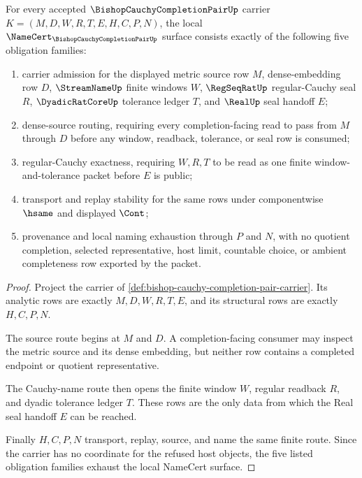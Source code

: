 \begin{theorem}
\label{thm:bishop-cauchy-completion-pair-namecert-obligations}
For every accepted $\BishopCauchyCompletionPairUp$ carrier $K=(M,D,W,R,T,E,H,C,P,N)$, the local $\NameCert_{\BishopCauchyCompletionPairUp}$ surface consists exactly of the following five obligation families:
\begin{enumerate}
\item carrier admission for the displayed metric source row $M$, dense-embedding row $D$, $\StreamNameUp$ finite windows $W$, $\RegSeqRatUp$ regular-Cauchy seal $R$, $\DyadicRatCoreUp$ tolerance ledger $T$, and $\RealUp$ seal handoff $E$;
\item dense-source routing, requiring every completion-facing read to pass from $M$ through $D$ before any window, readback, tolerance, or seal row is consumed;
\item regular-Cauchy exactness, requiring $W,R,T$ to be read as one finite window-and-tolerance packet before $E$ is public;
\item transport and replay stability for the same rows under componentwise $\hsame$ and displayed $\Cont$;
\item provenance and local naming exhaustion through $P$ and $N$, with no quotient completion, selected representative, host limit, countable choice, or ambient completeness row exported by the packet.
\end{enumerate}
\end{theorem}
\begin{proof}
Project the carrier of \autoref{def:bishop-cauchy-completion-pair-carrier}. Its analytic rows are exactly $M,D,W,R,T,E$, and its structural rows are exactly $H,C,P,N$.

The source route begins at $M$ and $D$. A completion-facing consumer may inspect the metric source and its dense embedding, but neither row contains a completed endpoint or quotient representative.

The Cauchy-name route then opens the finite window $W$, regular readback $R$, and dyadic tolerance ledger $T$. These rows are the only data from which the Real seal handoff $E$ can be reached.

Finally $H,C,P,N$ transport, replay, source, and name the same finite route. Since the carrier has no coordinate for the refused host objects, the five listed obligation families exhaust the local NameCert surface.
\end{proof}

